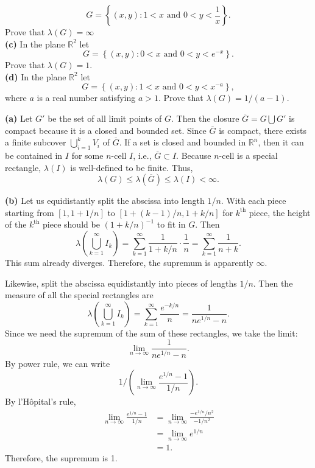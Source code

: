 \documentclass[answers]{exam}
\begin{document}
\begin{questions}
$$      G = \left\{\left(x,y\right): 1<x \text{ and } 0<y<\frac{1}{x} \right\}.
   $$
   Prove that $\lambda\left(G\right) = \infty$\\
   \textbf{(c)} In the plane $\mathbb{R}^{2}$ let
   $$
      G = \left\{\left(x,y\right): 0<x \text{ and } 0<y<e^{-x} \right\}.
   $$
   Prove that $\lambda\left(G\right)=1$. \\
   \textbf{(d)} In the plane $\mathbb{R}^{2}$ let
   $$
      G = \left\{\left(x,y\right): 1<x \text{ and } 0<y<x^{-a} \right\},
   $$
   where $a$ is a real number satisfying $a>1$. Prove that $\lambda\left(G\right) = 1/\left(a-1\right)$.
   \begin{solution}
      \textbf{(a)} Let $G'$ be the set of all limit points of $G$. Then the closure $\overline{G} = G \bigcup G'$ is compact because it is a closed and bounded set. Since $\overline{G}$ is compact, there exists a finite subcover $\bigcup_{i=1}^{k}V_{i}$ of $\overline{G}$. If a set is closed and bounded in $\mathbb{R}^{n}$, then it can be contained in $I$ for some $n$-cell $I$, i.e., $\overline{G} \subset I$. Because $n$-cell is a special rectangle, $\lambda\left(I\right)$ is well-defined to be finite. Thus,
      $$
         \lambda\left(G\right) \leq \lambda\left(\overline{G}\right) \leq \lambda\left(I\right) < \infty.
      $$
   \end{solution}

   \begin{solution}
      \textbf{(b)} Let us equidistantly split the abscissa into length $1/n$. With each piece starting from $\left[1, 1+1/n\right]$ to $\left[1+\left(k-1\right)/n, 1+k/n \right]$ for $k^{\text{th}}$ piece, the height of the $k^{\text{th}}$ piece should be $\left(1+k/n \right)^{-1}$ to fit in $G$. Then
      $$
         \lambda\left(\bigcup_{k=1}^{\infty} I_{k}\right) = \sum_{k=1}^{\infty}\frac{1}{1+k/n} \cdot \frac{1}{n} = \sum_{k=1}^{\infty}\frac{1}{n+k}.
      $$
      This sum already diverges. Therefore, the supremum is apparently $\infty$.
   \end{solution}

   \begin{solution}
      Likewise, split the abscissa equidistantly into pieces of lengths $1/n$. Then the measure of all the special rectangles are
      $$
         \lambda\left(\bigcup_{k=1}^{\infty}I_{k}\right) = \sum_{k=1}^{\infty}\frac{e^{-k/n}}{n} = \frac{1}{ne^{1/n}-n}.
      $$
      Since we need the supremum of the sum of these rectangles, we take the limit:
      $$
         \lim_{n\to\infty} \frac{1}{ne^{1/n}-n}.
      $$
      By power rule, we can write
      $$
         1\Big/\left(\lim\limits_{n\to\infty} \frac{e^{1/n}-1}{1/n}\right).
      $$
      By l'Hôpital's rule,
      \begin{align*}
         \lim_{n\to\infty}\frac{e^{1/n}-1}{1/n} &= \lim_{n\to\infty} \frac{-e^{1/n}/n^{2}}{-1/n^{2}}\\
         &= \lim_{n\to\infty} e^{1/n}\\
         &= 1.
      \end{align*}
      Therefore, the supremum is 1.
   \end{solution}


\end{questions}
\end{document}
